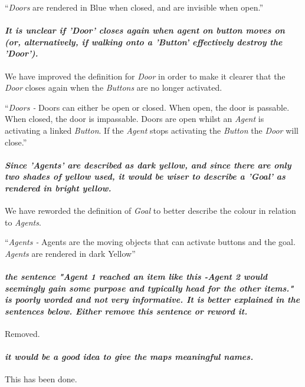 \documentclass{article}
\begin{document}
``\emph{Doors} are rendered in Blue when closed, and are invisible when open.''
\paragraph*{\textit{It is unclear if 'Door' closes again when agent on button moves on (or, alternatively, if walking onto a 'Button' effectively destroy the 'Door').}}
We have improved the definition for \emph{Door} in order to make it clearer that the \emph{Door} closes again when the \emph{Buttons} are no longer activated.

``\emph{Doors -} Doors can either be open or closed. When open, the door is passable. When closed, the door is impassable. Doors are open whilst an \emph{Agent} is activating a linked \emph{Button}. If the \emph{Agent} stops activating the \emph{Button} the \emph{Door} will close.''
\paragraph*{\textit{Since 'Agents' are described as dark yellow, and since there are only two shades of yellow used, it would be wiser to describe a 'Goal' as rendered in bright yellow.}}
We have reworded the definition of \emph{Goal} to better describe the colour in relation to \emph{Agents}.

``\emph{Agents -} Agents are the moving objects that can activate buttons and the goal. \emph{Agents} are rendered in dark Yellow''
\paragraph*{\textit{the sentence "Agent 1 reached an item like this -Agent 2 would seemingly gain some purpose and typically head for the other items." is poorly worded and not very informative. It is better explained in the sentences below. Either remove this sentence or reword it.}}
Removed.

\paragraph*{\textit{it would be a good idea to give the maps meaningful names.}}
This has been done.
\end{document}
